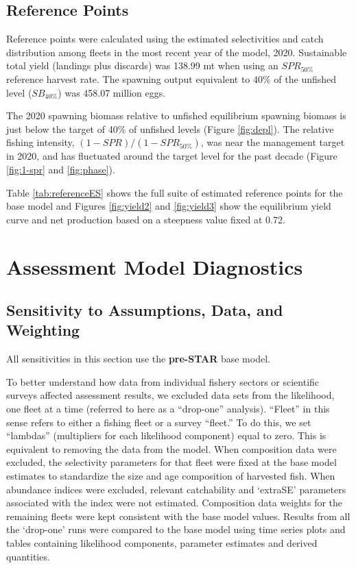 \documentclass[
  english,
  a4paper,
]{article}
\begin{document}
\hypertarget{reference-points-1}{%
\subsection{Reference Points}\label{reference-points-1}}

Reference points were calculated using the estimated selectivities and catch distribution among fleets in the most recent year of the model, 2020.
Sustainable total yield (landings plus discards) was
138.99 mt when using an \(SPR_{50\%}\)
reference harvest rate. The spawning output equivalent to 40\% of the unfished level (\(SB_{40\%}\)) was 458.07
million eggs.

The 2020 spawning biomass relative to unfished equilibrium spawning biomass is just below the target of 40\% of unfished levels (Figure \ref{fig:depl}).
The relative fishing intensity, \((1-SPR)/(1-SPR_{50\%})\), was near the management target in 2020, and has fluctuated around the target level for the past decade (Figure \ref{fig:1-spr} and \ref{fig:phase}).

Table \ref{tab:referenceES} shows the full suite of estimated reference points for the base model and Figures \ref{fig:yield2} and \ref{fig:yield3} show the equilibrium yield curve and net production based on a steepness value fixed at 0.72.

\hypertarget{assessment-model-diagnostics}{%
\section{Assessment Model Diagnostics}\label{assessment-model-diagnostics}}

\hypertarget{sensitivity-to-assumptions-data-and-weighting}{%
\subsection{Sensitivity to Assumptions, Data, and Weighting}\label{sensitivity-to-assumptions-data-and-weighting}}

All sensitivities in this section use the \textbf{pre-STAR} base model.

To better understand how data from individual fishery sectors or scientific surveys affected assessment results, we excluded data sets from the likelihood, one fleet at a time (referred to here as a ``drop-one'' analysis). ``Fleet'' in this sense refers to either a fishing fleet or a survey ``fleet.'' To do this, we set ``lambdas'' (multipliers for each likelihood component) equal to zero. This is equivalent to removing the data from the model. When composition data were excluded, the selectivity parameters for that fleet were fixed at the base model estimates to standardize the size and age composition of harvested fish. When abundance indices were excluded, relevant catchability and `extraSE' parameters associated with the index were not estimated. Composition data weights for the remaining fleets were kept consistent with the base model values. Results from all the `drop-one' runs were compared to the base model using time series plots and tables containing likelihood components, parameter estimates and derived quantities.
\end{document}

